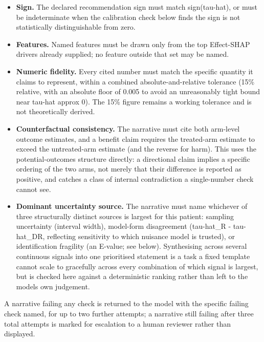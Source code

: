 \begin{itemize}
\item
 \textbf{Sign.} The declared recommendation sign must match sign(tau-hat), or must be \textquotesingle indeterminate\textquotesingle{} when the calibration check below finds the sign is not statistically distinguishable from zero.
\item
 \textbf{Features.} Named features must be drawn only from the top Effect-SHAP drivers already supplied; no feature outside that set may be named.
\item
 \textbf{Numeric fidelity.} Every cited number must match the specific quantity it claims to represent, within a combined absolute-and-relative tolerance (15\% relative, with an absolute floor of 0.005 to avoid an unreasonably tight bound near tau-hat approx 0). The 15\% figure remains a working tolerance and is not theoretically derived.
\item
 \textbf{Counterfactual consistency.} The narrative must cite both arm-level outcome estimates, and a \textquotesingle benefit\textquotesingle{} claim requires the treated-arm estimate to exceed the untreated-arm estimate (and the reverse for \textquotesingle harm\textquotesingle ). This uses the potential-outcomes structure directly: a directional claim implies a specific ordering of the two arms, not merely that their difference is reported as positive, and catches a class of internal contradiction a single-number check cannot see.
\item
 \textbf{Dominant uncertainty source.} The narrative must name whichever of three structurally distinct sources is largest for this patient: sampling uncertainty (interval width), model-form disagreement (\textbar tau-hat\_R - tau-hat\_DR\textbar , reflecting sensitivity to which nuisance model is trusted), or identification fragility (an E-value; see below). Synthesising across several continuous signals into one prioritised statement is a task a fixed template cannot scale to gracefully across every combination of which signal is largest, but is checked here against a deterministic ranking rather than left to the model\textquotesingle s own judgement.
\end{itemize}

A narrative failing any check is returned to the model with the specific failing check named, for up to two further attempts; a narrative still failing after three total attempts is marked for escalation to a human reviewer rather than displayed.

